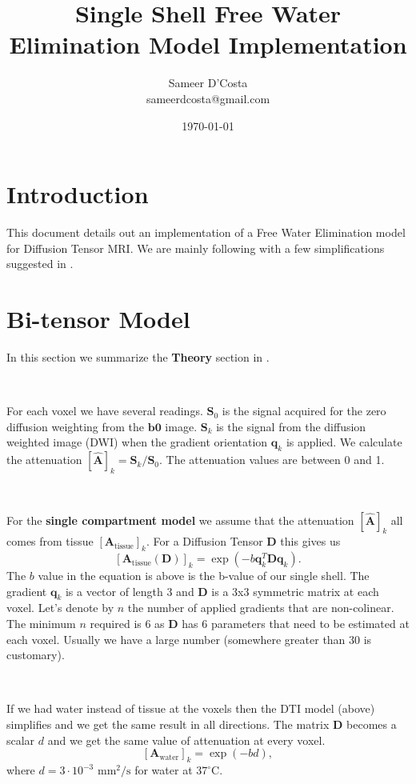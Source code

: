 \documentclass[12pt]{article}
\title{Single Shell Free Water Elimination Model Implementation
}
\author{
  Sameer D'Costa \\
    sameerdcosta@gmail.com
}
\date{\today}
\newcommand{\vect}[1]{\mathbf{#1}}
\newcommand{\Ahat}{\hat{\vect{A}}}
\newcommand{\Atissue}{\vect{A}_{\text{tissue}}}
\newcommand{\Awater}{\vect{A}_{\text{water}}}
\newcommand{\vD}{\vect{D}}
\newcommand{\vqk}{\vect{q}_k}
\begin{document}
\maketitle

\section{Introduction}
This document details out an implementation of a Free Water Elimination model
for Diffusion Tensor MRI. We are mainly following \cite{Pasternak2009} with a
few simplifications suggested in \cite{Pasternak2014}.

\section{Bi-tensor Model}
In this section we summarize the \textbf{Theory} section in
\cite{Pasternak2009}. 

\ 

\noindent
For each voxel we have several readings. $\vect{S}_0$ is the signal acquired
for the zero diffusion weighting from the $\vect{b0}$ image. $\vect{S}_k$ is
the signal from the diffusion weighted image (DWI) when the gradient
orientation $\vect{q}_k$ is applied. We calculate the attenuation
$[\hat{\vect{A}}]_k = \vect{S}_k / \vect{S}_0$. The attenuation values are
between 0 and 1. 

\ 

\noindent
For the \textbf{single compartment model} we assume that the attenuation
$[\Ahat]_k$ all comes from tissue $[\Atissue]_k$. For a Diffusion Tensor
$\vD$ this gives us 
$$[\Atissue(\vD)]_k = \exp(-b \vqk^T\vD\vect{q}_k).$$
The $b$ value in the equation is above is the b-value of our single shell. The
gradient $\vqk$ is a vector of length 3 and $\vD$ is a 3x3 symmetric
matrix at each voxel. Let's denote by $n$ the number of applied gradients that
are non-colinear.  The minimum $n$ required is 6 as $\vD$ has 6 parameters
that need to be estimated at each voxel. Usually we have a large number
(somewhere greater than 30 is customary).


\ 

\noindent
If we had water instead of tissue at the voxels then the DTI model (above)
simplifies and we get the same result in all directions. The matrix $\vect{D}$
becomes a scalar $d$ and we get the same value of attenuation at every voxel.
$$[\Awater]_k = \exp(-bd),$$
where $d = 3 \cdot 10^{-3}$ $\text{mm}^2/\text{s}$ for water at $37^\circ$C. 
\end{document}
